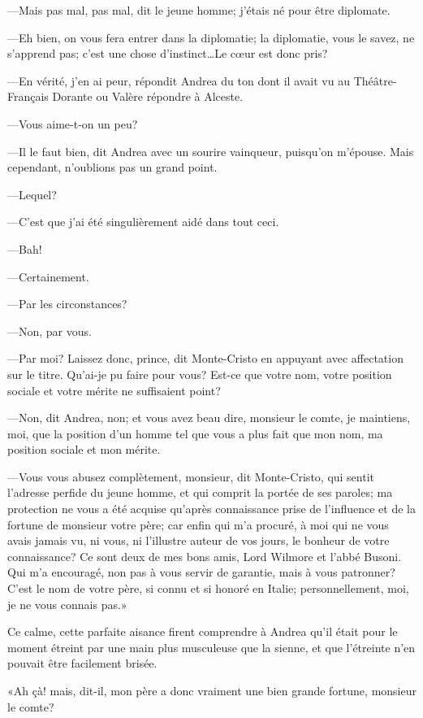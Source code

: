 —Mais pas mal, pas mal, dit le jeune homme; j'étais né pour être diplomate. 

—Eh bien, on vous fera entrer dans la diplomatie; la diplomatie, vous le savez, ne s'apprend pas; c'est une chose d'instinct\dots Le cœur est donc pris? 

—En vérité, j'en ai peur, répondit Andrea du ton dont il avait vu au Théâtre-Français Dorante ou Valère répondre à Alceste. 

—Vous aime-t-on un peu? 

—Il le faut bien, dit Andrea avec un sourire vainqueur, puisqu'on m'épouse. Mais cependant, n'oublions pas un grand point. 

—Lequel? 

—C'est que j'ai été singulièrement aidé dans tout ceci. 

—Bah! 

—Certainement. 

—Par les circonstances? 

—Non, par vous. 

—Par moi? Laissez donc, prince, dit Monte-Cristo en appuyant avec affectation sur le titre. Qu'ai-je pu faire pour vous? Est-ce que votre nom, votre position sociale et votre mérite ne suffisaient point? 

—Non, dit Andrea, non; et vous avez beau dire, monsieur le comte, je maintiens, moi, que la position d'un homme tel que vous a plus fait que mon nom, ma position sociale et mon mérite. 

—Vous vous abusez complètement, monsieur, dit Monte-Cristo, qui sentit l'adresse perfide du jeune homme, et qui comprit la portée de ses paroles; ma protection ne vous a été acquise qu'après connaissance prise de l'influence et de la fortune de monsieur votre père; car enfin qui m'a procuré, à moi qui ne vous avais jamais vu, ni vous, ni l'illustre auteur de vos jours, le bonheur de votre connaissance? Ce sont deux de mes bons amis, Lord Wilmore et l'abbé Busoni. Qui m'a encouragé, non pas à vous servir de garantie, mais à vous patronner? C'est le nom de votre père, si connu et si honoré en Italie; personnellement, moi, je ne vous connais pas.» 

Ce calme, cette parfaite aisance firent comprendre à Andrea qu'il était pour le moment étreint par une main plus musculeuse que la sienne, et que l'étreinte n'en pouvait être facilement brisée. 

«Ah çà! mais, dit-il, mon père a donc vraiment une bien grande fortune, monsieur le comte? 

